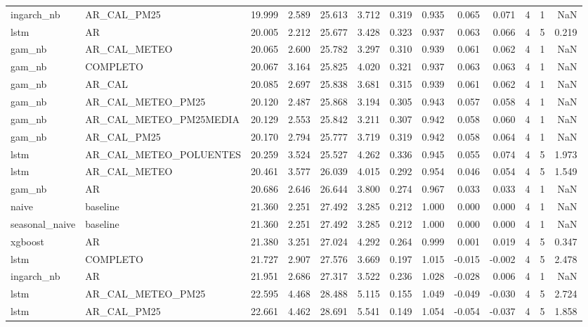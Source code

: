 \begin{tabular}{llrrrrrrrrrrr}
ingarch_nb & AR_CAL_PM25 & 19.999 & 2.589 & 25.613 & 3.712 & 0.319 & 0.935 & 0.065 & 0.071 & 4 & 1 & NaN \\
lstm & AR & 20.005 & 2.212 & 25.677 & 3.428 & 0.323 & 0.937 & 0.063 & 0.066 & 4 & 5 & 0.219 \\
gam_nb & AR_CAL_METEO & 20.065 & 2.600 & 25.782 & 3.297 & 0.310 & 0.939 & 0.061 & 0.062 & 4 & 1 & NaN \\
gam_nb & COMPLETO & 20.067 & 3.164 & 25.825 & 4.020 & 0.321 & 0.937 & 0.063 & 0.063 & 4 & 1 & NaN \\
gam_nb & AR_CAL & 20.085 & 2.697 & 25.838 & 3.681 & 0.315 & 0.939 & 0.061 & 0.062 & 4 & 1 & NaN \\
gam_nb & AR_CAL_METEO_PM25 & 20.120 & 2.487 & 25.868 & 3.194 & 0.305 & 0.943 & 0.057 & 0.058 & 4 & 1 & NaN \\
gam_nb & AR_CAL_METEO_PM25MEDIA & 20.129 & 2.553 & 25.842 & 3.211 & 0.307 & 0.942 & 0.058 & 0.060 & 4 & 1 & NaN \\
gam_nb & AR_CAL_PM25 & 20.170 & 2.794 & 25.777 & 3.719 & 0.319 & 0.942 & 0.058 & 0.064 & 4 & 1 & NaN \\
lstm & AR_CAL_METEO_POLUENTES & 20.259 & 3.524 & 25.527 & 4.262 & 0.336 & 0.945 & 0.055 & 0.074 & 4 & 5 & 1.973 \\
lstm & AR_CAL_METEO & 20.461 & 3.577 & 26.039 & 4.015 & 0.292 & 0.954 & 0.046 & 0.054 & 4 & 5 & 1.549 \\
gam_nb & AR & 20.686 & 2.646 & 26.644 & 3.800 & 0.274 & 0.967 & 0.033 & 0.033 & 4 & 1 & NaN \\
naive & baseline & 21.360 & 2.251 & 27.492 & 3.285 & 0.212 & 1.000 & 0.000 & 0.000 & 4 & 1 & NaN \\
seasonal_naive & baseline & 21.360 & 2.251 & 27.492 & 3.285 & 0.212 & 1.000 & 0.000 & 0.000 & 4 & 1 & NaN \\
xgboost & AR & 21.380 & 3.251 & 27.024 & 4.292 & 0.264 & 0.999 & 0.001 & 0.019 & 4 & 5 & 0.347 \\
lstm & COMPLETO & 21.727 & 2.907 & 27.576 & 3.669 & 0.197 & 1.015 & -0.015 & -0.002 & 4 & 5 & 2.478 \\
ingarch_nb & AR & 21.951 & 2.686 & 27.317 & 3.522 & 0.236 & 1.028 & -0.028 & 0.006 & 4 & 1 & NaN \\
lstm & AR_CAL_METEO_PM25 & 22.595 & 4.468 & 28.488 & 5.115 & 0.155 & 1.049 & -0.049 & -0.030 & 4 & 5 & 2.724 \\
lstm & AR_CAL_PM25 & 22.661 & 4.462 & 28.691 & 5.541 & 0.149 & 1.054 & -0.054 & -0.037 & 4 & 5 & 1.858 \\
\bottomrule
\end{tabular}
